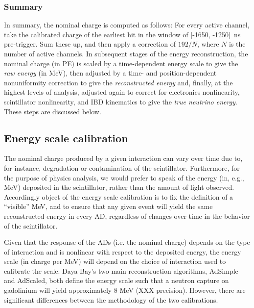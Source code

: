 \documentclass[../thesis.tex]{subfiles}
\begin{document}
\subsubsection{Summary}
\label{sec:reconChargeSummary}

In summary, the nominal charge is computed as follows: For every active channel,
take the calibrated charge of the earliest hit in the window of [-1650,
-1250]~ns pre-trigger. Sum these up, and then apply a correction of $192/N$,
where $N$ is the number of active channels. In subsequent stages of the energy
reconstruction, the nominal charge (in PE) is scaled by a time-dependent energy
scale to give the \emph{raw energy} (in MeV), then adjusted by a time- and
position-dependent nonuniformity correction to give the \emph{reconstructed
  energy} and, finally, at the highest levels of analysis, adjusted again to
correct for electronics nonlinearity, scintillator nonlinearity, and IBD
kinematics to give the \emph{true neutrino energy}. These steps are discussed
below.

\subsection{Energy scale calibration}
\label{sec:reconEnergyScale}

The nominal charge produced by a given interaction can vary over time due to,
for instance, degradation or contamination of the scintillator. Furthermore, for
the purpose of physics analysis, we would prefer to speak of the energy (in,
e.g., MeV) deposited in the scintillator, rather than the amount of light
observed. Accordingly object of the energy scale calibration is to fix the
definition of a ``visible'' MeV, and to ensure that any given event will yield
the same reconstructed energy in every AD, regardless of changes over time in
the behavior of the scintillator.

Given that the response of the ADs (i.e. the nominal charge) depends on the type
of interaction and is nonlinear with respect to the deposited energy, the energy
scale (in charge per MeV) will depend on the choice of interaction used to
calibrate the scale. Daya Bay's two main reconstruction algorithms, AdSimple and
AdScaled, both define the energy scale such that a neutron capture on gadolinium
will yield approximately 8 MeV (XXX precision). However, there are significant
differences between the methodology of the two calibrations.
\end{document}
